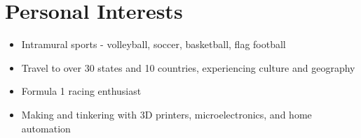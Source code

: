 \documentclass[letter,11pt]{article}
\newcommand{\resumeItemListStart}{\begin{justify}\begin{itemize}[leftmargin=3ex, rightmargin=2ex, noitemsep,labelsep=1.2mm,itemsep=0mm]\small}
\newcommand{\resumeItemListEnd}{\end{itemize}\end{justify}\vspace{-.5mm}}
\begin{document}
\vspace{-3.5mm}
\section{\textbf{Personal Interests}}
\vspace{-0.4mm}

\resumeItemListStart
\item Intramural sports - volleyball, soccer, basketball, flag football
\item Travel to over 30 states and 10 countries, experiencing culture and geography
\item Formula 1 racing enthusiast 
\item Making and tinkering with 3D printers, microelectronics, and home automation
\resumeItemListEnd

\vspace{2mm}

\end{document}

